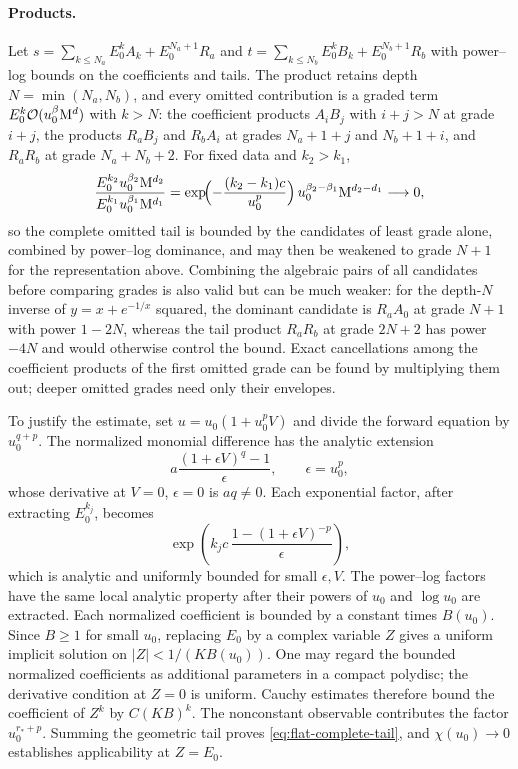 \paragraph{Products.}
Let $s=\sum_{k\le N_a}E_0^kA_k+E_0^{N_a+1}R_a$ and
$t=\sum_{k\le N_b}E_0^kB_k+E_0^{N_b+1}R_b$ with power--log bounds on the
coefficients and tails. The product retains depth $N=\min(N_a,N_b)$, and
every omitted contribution is a graded term $E_0^{k}\mathcal O(u_0^{\beta}\mathrm M^{d})$
with $k>N$: the coefficient products $A_iB_j$ with $i+j>N$ at grade $i+j$,
the products $R_aB_j$ and $R_bA_i$ at grades $N_a+1+j$ and $N_b+1+i$, and
$R_aR_b$ at grade $N_a+N_b+2$. For fixed data and $k_2>k_1$,
\[
 \frac{E_0^{k_2}u_0^{\beta_2}\mathrm M^{d_2}}{E_0^{k_1}u_0^{\beta_1}\mathrm M^{d_1}}
 =\exp\!\Bigl(-\frac{(k_2-k_1)c}{u_0^{p}}\Bigr)\,u_0^{\beta_2-\beta_1}\mathrm M^{d_2-d_1}
 \longrightarrow0,
\]
so the complete omitted tail is bounded by the candidates of least grade
alone, combined by power--log dominance, and may then be weakened to grade
$N+1$ for the representation above. Combining the algebraic pairs of all
candidates before comparing grades is also valid but can be much weaker:
for the depth-$N$ inverse of $y=x+e^{-1/x}$ squared, the dominant candidate
is $R_a A_0$ at grade $N+1$ with power $1-2N$, whereas the tail product
$R_aR_b$ at grade $2N+2$ has power $-4N$ and would otherwise control the
bound. Exact cancellations among the coefficient products of the first
omitted grade can be found by multiplying them out; deeper omitted grades
need only their envelopes.

To justify the estimate, set $u=u_0(1+u_0^p V)$ and divide the forward
equation by $u_0^{q+p}$. The normalized monomial difference has the analytic
extension
\[
 a\frac{(1+\epsilon V)^q-1}{\epsilon},
 \qquad \epsilon=u_0^p,
\]
whose derivative at $V=0$, $\epsilon=0$ is $a q\ne0$. Each exponential
factor, after extracting $E_0^{k_j}$, becomes
\[
 \exp\!\left(k_jc\,
 \frac{1-(1+\epsilon V)^{-p}}{\epsilon}\right),
\]
which is analytic and uniformly bounded for small $\epsilon,V$. The
power--log factors have the same local analytic property after their
powers of $u_0$ and $\log u_0$ are extracted. Each normalized coefficient
is bounded by a constant times $B(u_0)$. Since $B\ge1$ for small $u_0$,
replacing $E_0$ by a complex variable $Z$ gives a uniform implicit solution
on $|Z|<1/(K B(u_0))$. One may regard the bounded normalized coefficients
as additional parameters in a compact polydisc; the derivative condition
at $Z=0$ is uniform. Cauchy estimates therefore bound the coefficient of
$Z^k$ by $C(KB)^k$. The nonconstant observable contributes the factor
$u_0^{r_*+p}$. Summing the geometric tail proves
\eqref{eq:flat-complete-tail}, and $\chi(u_0)\to0$ establishes applicability
at $Z=E_0$.

